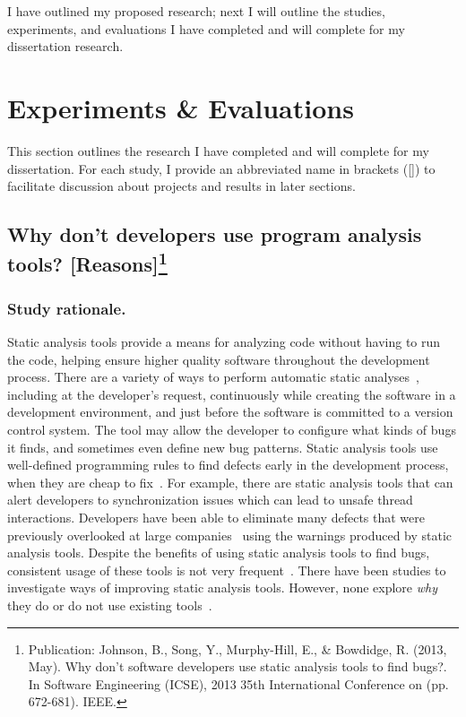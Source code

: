 \documentclass{llncs}
\begin{document}
I have outlined my proposed research; next I will outline the studies, experiments, and evaluations I have completed and will complete for my dissertation research.

\section{Experiments \& Evaluations}\label{sec:eval}
This section outlines the research I have completed and will complete for my dissertation. For each study, I provide an abbreviated name in brackets ([]) to facilitate discussion about projects and results in later sections.

\subsection{Why don't developers use program analysis tools? [Reasons]\protect\footnote{Publication: Johnson, B., Song, Y., Murphy-Hill, E., \& Bowdidge, R. (2013, May). Why don't software developers use static analysis tools to find bugs?. In Software Engineering (ICSE), 2013 35th International Conference on (pp. 672-681). IEEE.}}\label{subsec:s1}

\subsubsection{Study rationale.} Static analysis tools provide a means for analyzing code without having to run
the code, helping ensure higher quality software throughout the development process. There are a variety of ways to perform automatic static
analyses~\cite{Gegick:2007:AutomatedAnalysis}, including at the developer's request, continuously while creating the software in a development
environment, and just before the software is committed to a version control system. The tool may allow the developer to configure what kinds of bugs it
finds, and sometimes even define new bug patterns. Static analysis tools use well-defined programming rules to find defects early in the development process, when they
are cheap to fix~\cite{Ayewah:2008:FindBugs}. For example, there are static analysis tools that can alert developers to synchronization issues which can
lead to unsafe thread interactions. Developers have been able to eliminate many defects that were previously overlooked at large companies~\cite{Ayewah:2010:GFF} using the warnings produced
by static analysis tools. 
Despite the benefits of using static analysis tools to find bugs, consistent usage of these tools is not very frequent~\cite{Ayewah:2008:FindBugs}. 
There have been studies to investigate ways of improving static analysis tools. However, none explore \emph{why} they do or do not use existing tools~\cite{Bessey:2010:Coverity,Khoo:2008:PathProjection}. 
\end{document}
